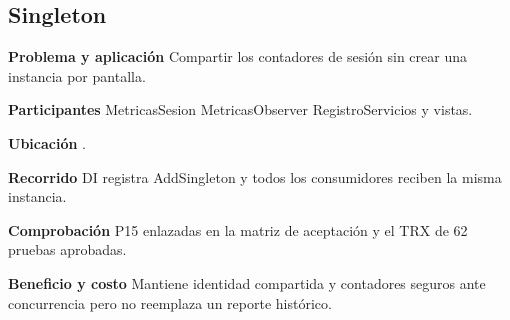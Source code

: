 \noindent\begin{minipage}{\linewidth}
\subsection{Singleton}
\textbf{Problema y aplicación} Compartir los contadores de sesión sin crear una instancia por pantalla.

\textbf{Participantes} MetricasSesion MetricasObserver RegistroServicios y vistas.

\textbf{Ubicación} \href{https://github.com/Alan77-bot/LogiMarket360Alan/blob/68bda51063441415524ede51bdf61649ee9b4973/LogiMarket.Application/Eventos/MetricasSesion.cs#L7}{}.

\textbf{Recorrido} DI registra AddSingleton y todos los consumidores reciben la misma instancia.


\textbf{Comprobación} P15 enlazadas en la matriz de aceptación y el TRX de 62 pruebas aprobadas.

\textbf{Beneficio y costo} Mantiene identidad compartida y contadores seguros ante concurrencia pero no reemplaza un reporte histórico.

\end{minipage}\par\smallskip
